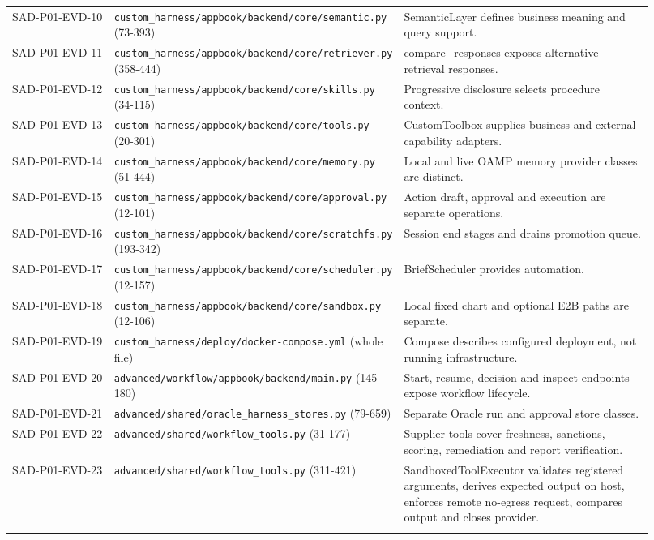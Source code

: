 \documentclass[10pt,letterpaper]{article}
\begin{document}
\begin{longtable}{@{}>{\raggedright\arraybackslash}p{0.17\linewidth}>{\raggedright\arraybackslash}p{0.34\linewidth}>{\raggedright\arraybackslash}p{0.41\linewidth}@{}}
SAD-P01-EVD-10 & \nolinkurl{custom_harness/appbook/backend/core/semantic.py} (73-393) & SemanticLayer defines business meaning and query support.\\\addlinespace
SAD-P01-EVD-11 & \nolinkurl{custom_harness/appbook/backend/core/retriever.py} (358-444) & compare\_responses exposes alternative retrieval responses.\\\addlinespace
SAD-P01-EVD-12 & \nolinkurl{custom_harness/appbook/backend/core/skills.py} (34-115) & Progressive disclosure selects procedure context.\\\addlinespace
SAD-P01-EVD-13 & \nolinkurl{custom_harness/appbook/backend/core/tools.py} (20-301) & CustomToolbox supplies business and external capability adapters.\\\addlinespace
SAD-P01-EVD-14 & \nolinkurl{custom_harness/appbook/backend/core/memory.py} (51-444) & Local and live OAMP memory provider classes are distinct.\\\addlinespace
SAD-P01-EVD-15 & \nolinkurl{custom_harness/appbook/backend/core/approval.py} (12-101) & Action draft, approval and execution are separate operations.\\\addlinespace
SAD-P01-EVD-16 & \nolinkurl{custom_harness/appbook/backend/core/scratchfs.py} (193-342) & Session end stages and drains promotion queue.\\\addlinespace
SAD-P01-EVD-17 & \nolinkurl{custom_harness/appbook/backend/core/scheduler.py} (12-157) & BriefScheduler provides automation.\\\addlinespace
SAD-P01-EVD-18 & \nolinkurl{custom_harness/appbook/backend/core/sandbox.py} (12-106) & Local fixed chart and optional E2B paths are separate.\\\addlinespace
SAD-P01-EVD-19 & \nolinkurl{custom_harness/deploy/docker-compose.yml} (whole file) & Compose describes configured deployment, not running infrastructure.\\\addlinespace
SAD-P01-EVD-20 & \nolinkurl{advanced/workflow/appbook/backend/main.py} (145-180) & Start, resume, decision and inspect endpoints expose workflow lifecycle.\\\addlinespace
SAD-P01-EVD-21 & \nolinkurl{advanced/shared/oracle_harness_stores.py} (79-659) & Separate Oracle run and approval store classes.\\\addlinespace
SAD-P01-EVD-22 & \nolinkurl{advanced/shared/workflow_tools.py} (31-177) & Supplier tools cover freshness, sanctions, scoring, remediation and report verification.\\\addlinespace
SAD-P01-EVD-23 & \nolinkurl{advanced/shared/workflow_tools.py} (311-421) & SandboxedToolExecutor validates registered arguments, derives expected output on host, enforces remote no-egress request, compares output and closes provider.\\\addlinespace

\end{longtable}
\end{document}
